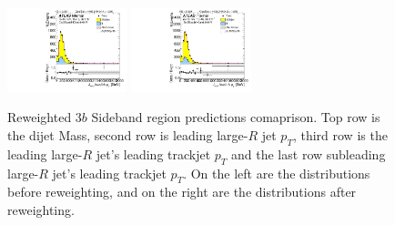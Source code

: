 \begin{figure}[htbp!]
\begin{center}
\includegraphics[width=0.31\textwidth,angle=-90]{figures/boosted/Prereweight/Moriond_ThreeTag_Sideband_sublHCand_trk0_Pt.pdf}
\includegraphics[width=0.31\textwidth,angle=-90]{figures/boosted/Sideband/b77_ThreeTag_Sideband_sublHCand_trk0_Pt.pdf}\\
\caption{Reweighted 3$b$ Sideband region predictions comaprison. Top row is the dijet Mass, second row is leading large-$R$ jet $p_{T}$, third row is the leading large-$R$ jet's leading trackjet $p_T$ and the last row subleading large-$R$ jet's leading trackjet $p_T$. On the left are the distributions before reweighting, and on the right are the distributions after reweighting.}
\label{fig:rw-3b-comp-sb}
\end{center}
\end{figure}


